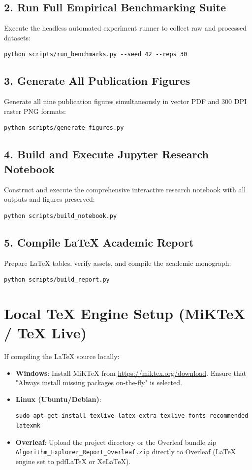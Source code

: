 \documentclass[11pt,a4paper,oneside]{report}
\theoremstyle{definition}
\begin{document}
\subsection{2. Run Full Empirical Benchmarking Suite}
Execute the headless automated experiment runner to collect raw and processed datasets:
\begin{verbatim}
python scripts/run_benchmarks.py --seed 42 --reps 30
\end{verbatim}

\subsection{3. Generate All Publication Figures}
Generate all nine publication figures simultaneously in vector PDF and 300 DPI raster PNG formats:
\begin{verbatim}
python scripts/generate_figures.py
\end{verbatim}

\subsection{4. Build and Execute Jupyter Research Notebook}
Construct and execute the comprehensive interactive research notebook with all outputs and figures preserved:
\begin{verbatim}
python scripts/build_notebook.py
\end{verbatim}

\subsection{5. Compile LaTeX Academic Report}
Prepare LaTeX tables, verify assets, and compile the academic monograph:
\begin{verbatim}
python scripts/build_report.py
\end{verbatim}

\section{Local TeX Engine Setup (MiKTeX / TeX Live)}
If compiling the LaTeX source locally:
\begin{itemize}
    \item \textbf{Windows}: Install MiKTeX from \url{https://miktex.org/download}. Ensure that "Always install missing packages on-the-fly" is selected.
    \item \textbf{Linux (Ubuntu/Debian)}:
\begin{verbatim}
sudo apt-get install texlive-latex-extra texlive-fonts-recommended latexmk
\end{verbatim}
    \item \textbf{Overleaf}: Upload the project directory or the Overleaf bundle zip \texttt{Algorithm\_Explorer\_Report\_Overleaf.zip} directly to Overleaf (LaTeX engine set to pdfLaTeX or XeLaTeX).
\end{itemize}
\end{document}
